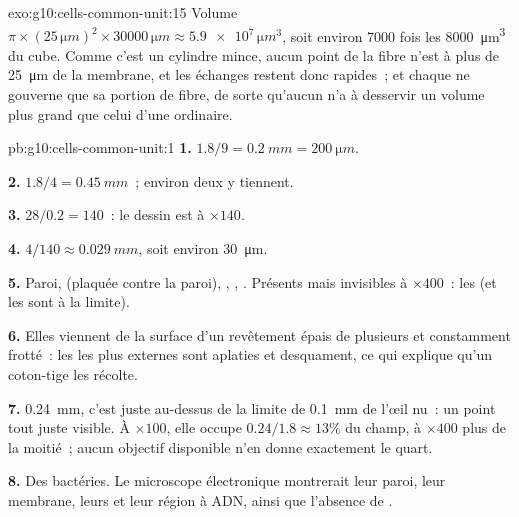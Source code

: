 \begin{solution}{exo:g10:cells-common-unit:15}
Volume $\pi \times (25\,\unit{\micro m})^2 \times 30000\,\unit{\micro m}
\approx \num{5.9e7}\,\unit{\micro m^3}$, soit environ 7000 fois les
\qty{8000}{\micro m^3} du cube. Comme c'est un cylindre mince, aucun
point de la fibre n'est à plus de \qty{25}{\micro m} de la membrane, et
les échanges restent donc rapides~; et chaque  ne gouverne que sa
portion de fibre, de sorte qu'aucun  n'a à desservir un volume
plus grand que celui d'une  ordinaire.
\end{solution}

\begin{solution}{pb:g10:cells-common-unit:1}
\textbf{1.} $1.8/9 = \qty{0.2}{mm} = \qty{200}{\micro m}$.

\textbf{2.} $1.8/4 = \qty{0.45}{mm}$~; environ deux  y tiennent.

\textbf{3.} $28/0.2 = 140$~: le dessin est à $\times 140$.

\textbf{4.} $4/140 \approx \qty{0.029}{mm}$, soit environ \qty{30}{\micro m}.

\textbf{5.} Paroi,  (plaquée contre la paroi),
, , . Présents mais invisibles à $\times 400$~:
les  (et les  sont à la limite).

\textbf{6.} Elles viennent de la surface d'un revêtement épais de
plusieurs  et constamment frotté~: les  les plus
externes sont aplaties et desquament, ce qui explique qu'un coton-tige
les récolte.

\textbf{7.} \qty{0.24}{mm}, c'est juste au-dessus de la limite de
\qty{0.1}{mm} de l'œil nu~: un point tout juste visible. À
$\times 100$, elle occupe $0.24/1.8 \approx 13\%$ du champ, à
$\times 400$ plus de la moitié~; aucun objectif disponible n'en donne
exactement le quart.

\textbf{8.} Des bactéries. Le microscope électronique montrerait leur
paroi, leur membrane, leurs  et leur région à ADN, ainsi que
l'absence de .


\end{solution}
